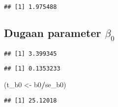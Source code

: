 \documentclass[
]{article}
\newenvironment{Shaded}{\begin{snugshade}}{\end{snugshade}}
\newcommand{\AttributeTok}[1]{\textcolor[rgb]{0.13,0.29,0.53}{#1}}
\newcommand{\DecValTok}[1]{\textcolor[rgb]{0.00,0.00,0.81}{#1}}
\newcommand{\FunctionTok}[1]{\textcolor[rgb]{0.13,0.29,0.53}{\textbf{#1}}}
\newcommand{\NormalTok}[1]{#1}
\newcommand{\OtherTok}[1]{\textcolor[rgb]{0.56,0.35,0.01}{#1}}
\newcommand{\SpecialCharTok}[1]{\textcolor[rgb]{0.81,0.36,0.00}{\textbf{#1}}}
\newcommand{\StringTok}[1]{\textcolor[rgb]{0.31,0.60,0.02}{#1}}
\begin{document}
\begin{verbatim}
## [1] 1.975488
\end{verbatim}

\hypertarget{dugaan-parameter-beta_0}{%
\subsection{\texorpdfstring{ Dugaan parameter
\(\beta_0\)}{ Dugaan parameter \textbackslash beta\_0}}\label{dugaan-parameter-beta_0}}

\begin{Shaded}
\end{Shaded}

\begin{verbatim}
## [1] 3.399345
\end{verbatim}

\begin{Shaded}
\end{Shaded}

\begin{verbatim}
## [1] 0.1353233
\end{verbatim}

\begin{Shaded}
\begin{Highlighting}[]
\NormalTok{(t\_b0 }\OtherTok{\textless{}{-}}\NormalTok{ b0}\SpecialCharTok{/}\NormalTok{se\_b0)}
\end{Highlighting}
\end{Shaded}

\begin{verbatim}
## [1] 25.12018
\end{verbatim}
\end{document}
